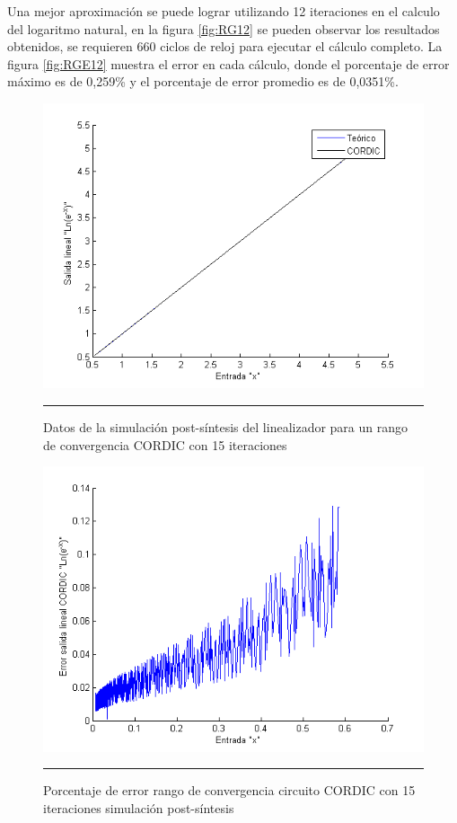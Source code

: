 Una mejor aproximación se puede lograr utilizando 12 iteraciones en el calculo del logaritmo natural, en la figura \ref{fig:RG12} se pueden observar los resultados obtenidos, se requieren 660 ciclos de reloj para ejecutar el cálculo completo. La figura \ref{fig:RGE12} muestra el error en cada cálculo, donde el porcentaje de error máximo es de  0,259\% y el porcentaje de error promedio es de 0,0351\%. 

\begin{figure}[H]
  \centering
    \includegraphics[scale=0.7]{./RANGO_15iter.png}
    \rule{35em}{0.5pt}
  \caption[Datos de la simulación post-síntesis del linealizador para un rango de convergencia CORDIC con 15 iteraciones]{Datos de la simulación post-síntesis del linealizador para un rango de convergencia CORDIC con 15 iteraciones}
  \label{fig:RG15}
\end{figure}

\begin{figure}[H]
  \centering
    \includegraphics[scale=0.7]{./RANGO_15iter_ERROR.png}
    \rule{35em}{0.5pt}
  \caption[Porcentaje de error rango de convergencia circuito CORDIC con 15 iteraciones simulación post-síntesis]{Porcentaje de error rango de convergencia circuito CORDIC con 15 iteraciones simulación post-síntesis}
  \label{fig:RGE15}
\end{figure}


